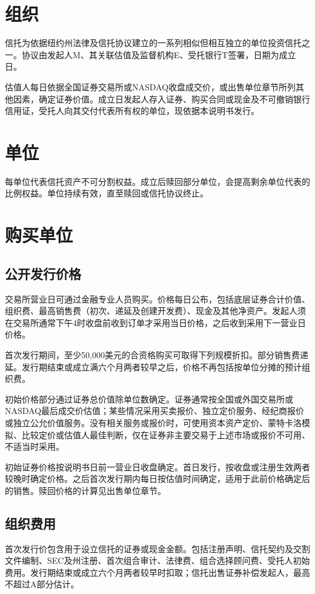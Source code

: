 \documentclass[UTF8,fontset=none,11pt,a4paper]{ctexart}
\begin{document}
\section*{组织}
信托为依据纽约州法律及信托协议建立的一系列相似但相互独立的单位投资信托之一。协议由发起人M、其关联估值及监督机构E、受托银行T签署，日期为成立日。


估值人每日依据全国证券交易所或NASDAQ收盘成交价，或出售单位章节所列其他因素，确定证券价值。成立日发起人存入证券、购买合同或现金及不可撤销银行信用证，受托人向其交付代表所有权的单位，现依据本说明书发行。


\section*{单位}
每单位代表信托资产不可分割权益。成立后赎回部分单位，会提高剩余单位代表的比例权益。单位持续有效，直至赎回或信托协议终止。


\section*{购买单位}
\subsection*{公开发行价格}
交易所营业日可通过金融专业人员购买。价格每日公布，包括底层证券合计价值、组织费、最高销售费（初次、递延及创建开发费）、现金及其他净资产。发起人须在交易所通常下午4时收盘前收到订单才采用当日价格，之后收到采用下一营业日价格。


首次发行期间，至少50,000美元的合资格购买可取得下列规模折扣。部分销售费递延。发行期结束或成立满六个月两者较早之后，价格不再包括按单位分摊的预计组织费。


初始价格部分通过证券总价值除单位数确定。证券通常按全国或外国交易所或NASDAQ最后成交价估值；某些情况采用买卖报价、独立定价服务、经纪商报价或独立公允价值服务。没有相关服务或报价时，可使用资本资产定价、蒙特卡洛模拟、比较定价或估值人最佳判断，仅在证券非主要交易于上述市场或报价不可用、不适当时采用。


初始证券价格按说明书日前一营业日收盘确定。首日发行，按收盘或注册生效两者较晚时确定价格。之后首次发行期内每日按估值时间确定，适用于此前价格确定后的销售。赎回价格的计算见出售单位章节。


\subsection*{组织费用}
首次发行价包含用于设立信托的证券或现金金额。包括注册声明、信托契约及交割文件编制、SEC及州注册、首次组合审计、法律费、组合选择顾问费、受托人初始费用。发行期结束或成立六个月两者较早时扣取；信托出售证券补偿发起人，最高不超过A部分估计。
\end{document}
